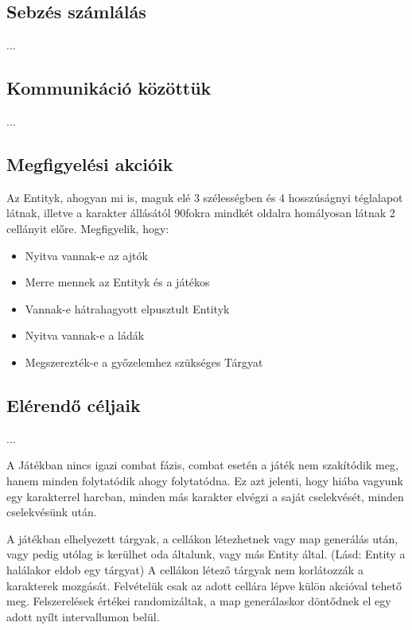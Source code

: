 \subsection{Sebzés számlálás}

...

\subsection{Kommunikáció közöttük}

...

\subsection{Megfigyelési akcióik}

Az Entityk, ahogyan mi is, maguk elé 3 szélességben és 4 hosszúságnyi téglalapot látnak, illetve a karakter állásától 90fokra mindkét oldalra homályosan látnak 2 cellányit előre.
Megfigyelik, hogy:
\begin{itemize}
    \item Nyitva vannak-e az ajtók
    \item Merre mennek az Entityk és a játékos
    \item Vannak-e hátrahagyott elpusztult Entityk
    \item Nyitva vannak-e a ládák
    \item Megszerezték-e a győzelemhez szükséges Tárgyat
\end{itemize}

\subsection{Elérendő céljaik}

...


A Játékban nincs igazi combat fázis, combat esetén a játék nem szakítódik meg, hanem minden folytatódik ahogy folytatódna.
Ez azt jelenti, hogy hiába vagyunk egy karakterrel harcban, minden más karakter elvégzi a saját cselekvését, minden cselekvésünk után.



A játékban elhelyezett tárgyak, a cellákon létezhetnek vagy map generálás után,
vagy pedig utólag is kerülhet oda általunk, vagy más Entity által. (Lásd: Entity a halálakor eldob egy tárgyat)
A cellákon létező tárgyak nem korlátozzák a karakterek mozgását.
Felvételük csak az adott cellára lépve külön akcióval tehető meg.
Felszerelések értékei randomizáltak, a map generálaskor döntődnek el egy adott nyílt intervallumon belül.

